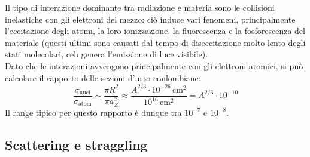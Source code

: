 Il tipo di interazione dominante tra radiazione e materia sono le collisioni inelastiche con gli elettroni del mezzo: ciò induce vari fenomeni, principalmente l'eccitazione degli atomi, la loro ionizzazione, la fluorescenza e la fosforescenza del materiale (questi ultimi sono causati dal tempo di diseccitazione molto lento degli stati molecolari, ceh genera l'emissione di luce visibile).\\
Dato che le interazioni avvengono principalmente con gli elettroni atomici, si può calcolare il rapporto delle sezioni d'urto coulombiane:
\begin{equation}
	\frac{\sigma_{\text{nucl}}}{\sigma_{\text{atom}}} \sim \frac{\pi R^2}{\pi a_Z^2} \approx \frac{A^{2/3} \cdot 10^{-26} \,\text{cm}^2}{10^{16} \,\text{cm}^2} = A^{2/3} \cdot 10^{-10}
	\label{eq:3.1}
\end{equation}
Il range tipico per questo rapporto è dunque tra $ 10^{-7} $ e $ 10^{-8} $.

\subsection{Scattering e straggling}

